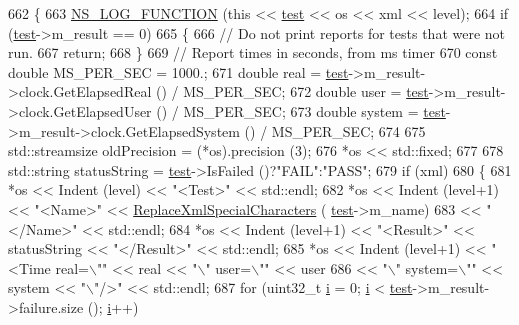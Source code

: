 \begin{DoxyCode}
662 \{
663   \hyperlink{log-macros-disabled_8h_a90b90d5bad1f39cb1b64923ea94c0761}{NS\_LOG\_FUNCTION} (\textcolor{keyword}{this} << \hyperlink{main-test-sync_8cc_a708a4c1a4d0c4acc4c447310dd4db27f}{test} << os << xml << level);
664   \textcolor{keywordflow}{if} (\hyperlink{main-test-sync_8cc_a708a4c1a4d0c4acc4c447310dd4db27f}{test}->m\_result == 0)
665     \{
666       \textcolor{comment}{// Do not print reports for tests that were not run.}
667       \textcolor{keywordflow}{return};
668     \}
669   \textcolor{comment}{// Report times in seconds, from ms timer}
670   \textcolor{keyword}{const} \textcolor{keywordtype}{double} MS\_PER\_SEC = 1000.;
671   \textcolor{keywordtype}{double} real = \hyperlink{main-test-sync_8cc_a708a4c1a4d0c4acc4c447310dd4db27f}{test}->m\_result->clock.GetElapsedReal () / MS\_PER\_SEC;
672   \textcolor{keywordtype}{double} user = \hyperlink{main-test-sync_8cc_a708a4c1a4d0c4acc4c447310dd4db27f}{test}->m\_result->clock.GetElapsedUser () / MS\_PER\_SEC;
673   \textcolor{keywordtype}{double} system = \hyperlink{main-test-sync_8cc_a708a4c1a4d0c4acc4c447310dd4db27f}{test}->m\_result->clock.GetElapsedSystem () / MS\_PER\_SEC;
674 
675   std::streamsize oldPrecision = (*os).precision (3);
676   *os << std::fixed;
677 
678   std::string statusString = \hyperlink{main-test-sync_8cc_a708a4c1a4d0c4acc4c447310dd4db27f}{test}->IsFailed ()?\textcolor{stringliteral}{"FAIL"}:\textcolor{stringliteral}{"PASS"};
679   \textcolor{keywordflow}{if} (xml)
680     \{
681       *os << Indent (level) << \textcolor{stringliteral}{"<Test>"} << std::endl;
682       *os << Indent (level+1) << \textcolor{stringliteral}{"<Name>"} << \hyperlink{classns3_1_1TestRunnerImpl_a0fb43cfe6d466a412f52d57dd391bbcd}{ReplaceXmlSpecialCharacters} (
      \hyperlink{main-test-sync_8cc_a708a4c1a4d0c4acc4c447310dd4db27f}{test}->m\_name)
683           << \textcolor{stringliteral}{"</Name>"} << std::endl;
684       *os << Indent (level+1) << \textcolor{stringliteral}{"<Result>"} << statusString << \textcolor{stringliteral}{"</Result>"} << std::endl;
685       *os << Indent (level+1) << \textcolor{stringliteral}{"<Time real=\(\backslash\)""} << real << \textcolor{stringliteral}{"\(\backslash\)" user=\(\backslash\)""} << user 
686           << \textcolor{stringliteral}{"\(\backslash\)" system=\(\backslash\)""} << system << \textcolor{stringliteral}{"\(\backslash\)"/>"} << std::endl;
687       \textcolor{keywordflow}{for} (uint32\_t \hyperlink{bernuolliDistribution_8m_a6f6ccfcf58b31cb6412107d9d5281426}{i} = 0; \hyperlink{bernuolliDistribution_8m_a6f6ccfcf58b31cb6412107d9d5281426}{i} < \hyperlink{main-test-sync_8cc_a708a4c1a4d0c4acc4c447310dd4db27f}{test}->m\_result->failure.size (); \hyperlink{bernuolliDistribution_8m_a6f6ccfcf58b31cb6412107d9d5281426}{i}++)

\end{DoxyCode}
